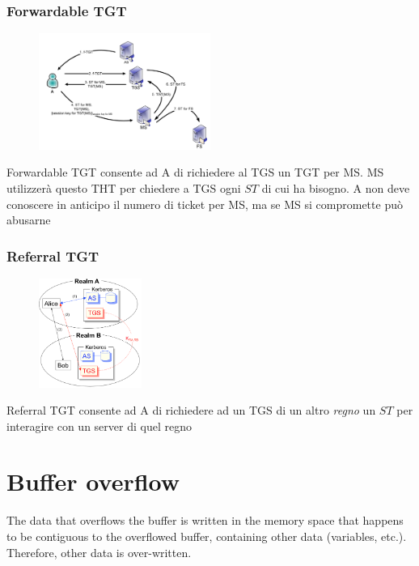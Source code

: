 \documentclass[a4paper,12pt]{article}
\begin{document}
\subsubsection{Forwardable TGT}

\begin{figure}[H]
  \centering
  \includegraphics[width=0.5\textwidth]{img/forward}
\end{figure}
Forwardable TGT consente ad A di richiedere al TGS un TGT per MS. MS utilizzerà questo THT per chiedere a TGS ogni $ST$ di cui ha bisogno.
A non deve conoscere in anticipo il numero di ticket per MS, ma se MS si compromette può abusarne

\subsubsection{Referral TGT}

\begin{figure}[H]
  \centering
  \includegraphics[width=0.3\textwidth]{img/realms}
\end{figure}
Referral TGT consente ad A di richiedere ad un TGS di un altro \textit{regno} un $ST$ per interagire con un server di quel regno

\newpage

\appendix

\section{Buffer overflow}
The data that overflows the buffer is written in the memory space that happens to be contiguous to the overflowed buffer, containing other data (variables, etc.). Therefore, other data is over-written.
\end{document}
